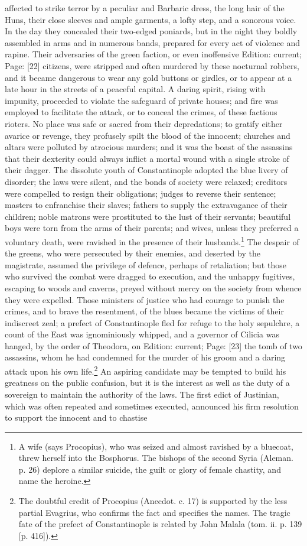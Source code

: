 affected to strike terror by a peculiar and Barbaric dress, the long hair of the Huns, their close sleeves and ample garments, a lofty step, and a sonorous voice. In the day they concealed their two-edged poniards, but in the night they boldly assembled in arms and in numerous bands, prepared for every act of violence and rapine. Their adversaries of the green faction, or even inoffensive Edition: current; Page: [22] citizens, were stripped and often murdered by these nocturnal robbers, and it became dangerous to wear any gold buttons or girdles, or to appear at a late hour in the streets of a peaceful capital. A daring spirit, rising with impunity, proceeded to violate the safeguard of private houses; and fire was employed to facilitate the attack, or to conceal the crimes, of these factious rioters. No place was safe or sacred from their depredations; to gratify either avarice or revenge, they profusely spilt the blood of the innocent; churches and altars were polluted by atrocious murders; and it was the boast of the assassins that their dexterity could always inflict a mortal wound with a single stroke of their dagger. The dissolute youth of Constantinople adopted the blue livery of disorder; the laws were silent, and the bonds of society were relaxed; creditors were compelled to resign their obligations; judges to reverse their sentence; masters to enfranchise their slaves; fathers to supply the extravagance of their children; noble matrons were prostituted to the lust of their servants; beautiful boys were torn from the arms of their parents; and wives, unless they preferred a voluntary death, were ravished in the presence of their husbands.\footnote{A wife (says Procopius), who was seized and almost ravished by a bluecoat, threw herself into the Bosphorus. The bishops of the second Syria (Aleman. p. 26) deplore a similar suicide, the guilt or glory of female chastity, and name the heroine.} The despair of the greens, who were persecuted by their enemies, and deserted by the magistrate, assumed the privilege of defence, perhaps of retaliation; but those who survived the combat were dragged to execution, and the unhappy fugitives, escaping to woods and caverns, preyed without mercy on the society from whence they were expelled. Those ministers of justice who had courage to punish the crimes, and to brave the resentment, of the blues became the victims of their indiscreet zeal; a prefect of Constantinople fled for refuge to the holy sepulchre, a count of the East was ignominiously whipped, and a governor of Cilicia was hanged, by the order of Theodora, on Edition: current; Page: [23] the tomb of two assassins, whom he had condemned for the murder of his groom and a daring attack upon his own life.\footnote{The doubtful credit of Procopius (Anecdot. c. 17) is supported by the less partial Evagrius, who confirms the fact and specifies the names. The tragic fate of the prefect of Constantinople is related by John Malala (tom. ii. p. 139 [p. 416]).} An aspiring candidate may be tempted to build his greatness on the public confusion, but it is the interest as well as the duty of a sovereign to maintain the authority of the laws. The first edict of Justinian, which was often repeated and sometimes executed, announced his firm resolution to support the innocent and to chastise 